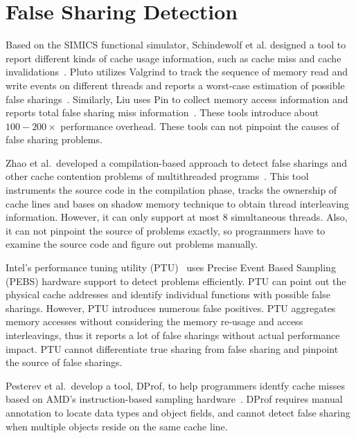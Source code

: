 \section{False Sharing Detection}

Based on the SIMICS functional simulator, 
Schindewolf et al. designed a tool to report different kinds of cache usage information,
such as cache miss and cache invalidations~\cite{falseshare:simulator}. 
Pluto utilizes Valgrind to track the sequence of memory read and write
events on different threads and reports a worst-case estimation of
possible false sharings~\cite{falseshare:binaryinstrumentation1}. 
Similarly, Liu uses Pin to collect memory access information and 
reports total false sharing miss information~\cite{falseshare:binaryinstrumentation2}. 
These tools introduce about $100-200\times$ performance overhead. 
These tools can not pinpoint the causes of false sharing problems. 

Zhao et al.\ developed a compilation-based approach to 
detect false sharings and other cache contention problems
of multithreaded programs~\cite{qinzhao}. This
tool instruments the source code in the compilation phase, 
tracks the ownership of cache lines and 
bases on shadow memory technique to obtain thread interleaving information.
However, it can only support at most 8 simultaneous
threads. Also, it can not pinpoint the source of problems exactly, 
so programmers have to examine the source code and figure out problems
manually.

Intel's performance tuning utility (PTU)~\cite{detect:ptu, detect:intel} uses Precise 
Event Based Sampling (PEBS) hardware support to detect problems efficiently. 
PTU can point out the physical cache addresses 
and identify individual functions with possible false sharings.
However, PTU introduces numerous false positives. 
PTU aggregates memory accesses without considering the memory re-usage and
access interleavings, thus it reports a lot of   
false sharings without actual performance impact.
PTU cannot differentiate true sharing from
false sharing and pinpoint the source of false sharings.

Pesterev et al.\ develop a tool, DProf, to help programmers identfy cache misses based on
AMD's instruction-based sampling hardware~\cite{DProf}. 
DProf requires manual annotation
to locate data types and object fields, and cannot detect false
sharing when multiple objects reside on the same cache line. 

